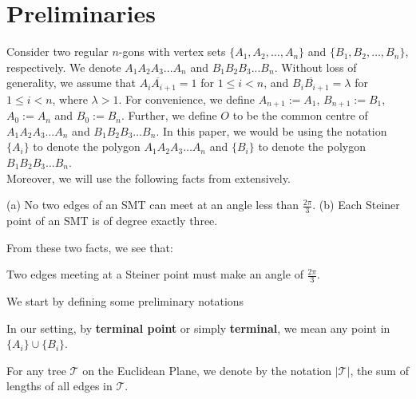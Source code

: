 \section{Preliminaries} \label{preliminaries}

 Consider two regular $n$-gons with vertex sets $\{A_1,A_2,\ldots, A_n\}$ and $\{B_1,B_2,\ldots, B_n\}$, respectively. We denote $A_1A_2A_3...A_n$ and $B_1B_2B_3...B_n$. Without loss of generality, we assume that $\overline{A_iA_{i + 1}} = 1$ for $1 \le i < n$, and $\overline{B_iB_{i + 1}} = \lambda $ for $1 \le i < n$, where $\lambda > 1$. For convenience, we define $A_{n + 1} := A_1$, $B_{n + 1} := B_1$, $A_0 := A_n$ and $B_0 := B_n$. Further, we define $O$ to be the common centre of $A_1A_2A_3 \ldots A_n$ and $B_1B_2B_3 \ldots B_n$. In this paper, we would be using the notation $\{A_i\}$ to denote the polygon $A_1A_2A_3 \ldots A_n$ and $\{B_i\}$ to denote the polygon $B_1B_2B_3 \ldots B_n$. \\

Moreover, we will use the following facts from \cite{hwang1992steiner} extensively.

\begin{lemma} \label{atleast_120}
    (a) No two edges of an SMT can meet at an angle less than $\frac{2 \pi}{3}$. (b) Each Steiner point of an SMT is of degree exactly three.
\end{lemma}

From these two facts, we see that:

\begin{lemma}
    Two edges meeting at a Steiner point must make an angle of $\frac{2 \pi}{3}$.
\end{lemma}

We start by defining some preliminary notations

\begin{definition}
    In our setting, by \textbf{terminal point} or simply \textbf{terminal}, we mean any point in $\{A_i\} \cup \{B_i\}$.
\end{definition}

\begin{definition}
    For any tree $\mathcal T$ on the Euclidean Plane, we denote by the notation $|\mathcal T|$, the sum of lengths of all edges in $\mathcal T$. 
\end{definition}